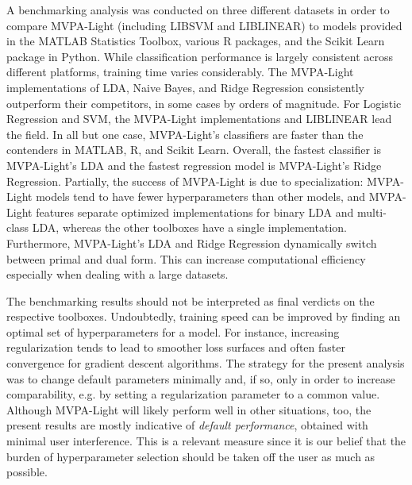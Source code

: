 \documentclass[utf8]{frontiersSCNS} %
\begin{document}
A benchmarking analysis was conducted on three different datasets in order to compare MVPA-Light (including LIBSVM and LIBLINEAR) to models provided in the MATLAB Statistics Toolbox, various R packages, and the Scikit Learn package in Python. While classification performance is largely consistent across different platforms, training time varies considerably. The MVPA-Light implementations of LDA, Naive Bayes, and Ridge Regression consistently outperform  their competitors, in some cases by orders of magnitude. For Logistic Regression and SVM, the MVPA-Light implementations and LIBLINEAR lead the field. In all but one case, MVPA-Light's classifiers are faster than the contenders in MATLAB, R, and Scikit Learn. Overall, the fastest classifier is MVPA-Light's LDA and the fastest regression model is MVPA-Light's Ridge Regression. Partially, the success of MVPA-Light is due to specialization: MVPA-Light models tend to have fewer hyperparameters than other models, and MVPA-Light features separate optimized implementations for binary LDA and multi-class LDA, whereas the other toolboxes have a single implementation. Furthermore, MVPA-Light's LDA and Ridge Regression dynamically switch between primal and dual form. This can increase computational efficiency especially when dealing with a large datasets.

The benchmarking results should not be interpreted as final verdicts on the respective toolboxes. 
 Undoubtedly, training speed can be improved by finding an optimal set of hyperparameters for a model. For instance, increasing regularization tends to lead to smoother loss surfaces and often faster convergence for gradient descent algorithms. The strategy for the present analysis was to change default parameters minimally and, if so, only in order to increase comparability, e.g. by setting a regularization parameter to a common value. 
 Although MVPA-Light will likely perform well in other situations, too, the present results are mostly indicative of \textit{default performance}, obtained with minimal user interference. This is a relevant measure since it is our belief that the burden of hyperparameter selection should be taken off the user as much as possible.


\end{document}
